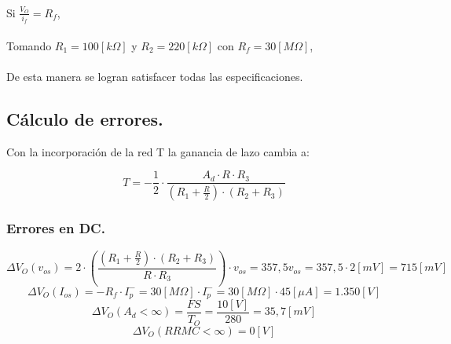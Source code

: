 \paragraph{}
Si $\frac{V_O}{i_f}=R_f$,
\begin{center}
\end{center}

\paragraph{}
Tomando  $R_1 = 100[k\Omega]$ y $R_2 = 220[k\Omega]$ con $R_f=30[M\Omega]$,
\begin{center}
\end{center}

\paragraph{}
De esta manera se logran satisfacer todas las especificaciones.

\subsection{Cálculo de errores.}
\onehalfspacing
Con la incorporación de la red T la ganancia de lazo cambia a:

\begin{equation}
    \nonumber
    T = - \frac{1}{2}\cdot \frac{A_d \cdot R \cdot R_3}{\left( 
R_1 + \frac{R}{2} \right) \cdot \left( R_2 + R_3 \right)}
\end{equation}

\subsubsection{Errores en DC.}
\onehalfspacing
\begin{equation}
    \nonumber
    \Delta V_{O}(v_{os}) = 2 \cdot \left( \frac{\left( 
R_1 + \frac{R}{2} \right) \cdot \left( R_2 + R_3 \right)}{R \cdot R_3} \right) \cdot v_{os} = 357,5v_{os} = 357,5\cdot 2[mV]  = 715[mV]
\end{equation}
\begin{equation}
    \nonumber
    \Delta V_{O}(I_{os}) = -R_f\cdot I_p^{-} = 30[M\Omega]\cdot I_p^{-} = 30[M\Omega]\cdot 45[\mu A]  = 1.350[V]
\end{equation}
\begin{equation}
    \nonumber
    \Delta V_{O}(A_d<\infty) = \frac{FS}{T_O} = \frac{10[V]}{280} = 35,7[mV]
\end{equation}
\begin{equation}
    \nonumber
    \Delta V_{O}(RRMC<\infty) = 0[V]
\end{equation}

